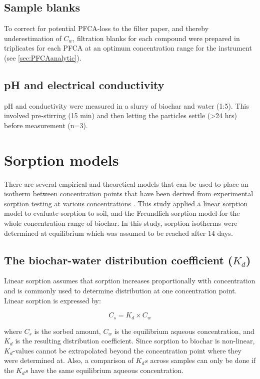 \subsection{Sample blanks \label{sec:blanks}}
To correct for potential PFCA-loss to the filter paper, and thereby underestimation of $C_w$, filtration blanks for each compound were prepared in triplicates for each PFCA at an optimum concentration range for the instrument (see \cref{sec:PFCAanalytic}).

\subsection{pH and electrical conductivity}
pH and conductivity were measured in a slurry of biochar and water (1:5). This involved pre-stirring (15 min) and then letting the particles settle (\textgreater 24 hrs) before measurement (n=3).

\section{Sorption models}
There are several empirical and theoretical models that can be used to place an isotherm between concentration points that have been derived from experimental sorption testing at various concentrations \citep{wang2020adsorption}. This study applied a linear sorption model to evaluate sorption to soil, and the Freundlich sorption model for the whole concentration range of biochar. In this study, sorption isotherms were determined at equilibrium which was assumed to be reached after 14 days.

\subsection{The biochar-water distribution coefficient ($K_d$)}
Linear sorption assumes that sorption increases proportionally with concentration and is commonly used to determine distribution at one concentration point. Linear sorption is expressed by: 

\begin{equation}\label{eq:linear}
C_s = K_d \times C_w
\end{equation}

where $C_s$ is the sorbed amount, $C_w$ is the equilibrium aqueous concentration, and $K_d$ is the resulting distribution coefficient. Since sorption to biochar is non-linear, $K_d$-values cannot be extrapolated beyond the concentration point where they were determined at. Also, a comparison of $K_ds$ across samples can only be done if the $K_ds$ have the same equilibrium aqueous concentration.

